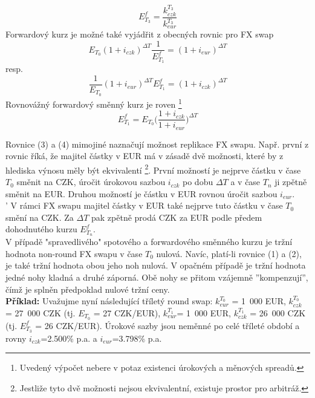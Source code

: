 \documentclass[a4paper]{article}
\begin{document}
\begin{displaymath}
E^f_{T_3} = \frac{k_{czk}^{T_3}}{k_{eur}^{T_3}}
\end{displaymath}
Forwardový kurz je možné také vyjádřit z obecných rovnic pro FX swap
\begin{equation}
E_{T_0} (1 + i_{czk})^{\Delta T} \frac{1}{E^f_{T_1}} = (1 + i_{eur})^{\Delta T}
\end{equation}
resp.
\begin{equation}
\frac{1}{E_{T_0}}(1 + i_{eur})^{\Delta T} E^f_{T_1} = (1 + i_{czk})^{\Delta T}
\end{equation}
Rovnovážný forwardový směnný kurz je roven \footnote{Uvedený výpočet nebere v potaz existenci úrokových a měnových spreadů.}
\begin{displaymath}
E^f_{T_1} = E_{T_0} \Bigg( \frac{1+i_{czk}}{1+i_{eur}} \Bigg)^{\Delta T}
\end{displaymath}

Rovnice (3) a (4) mimojiné naznačují možnost replikace FX swapu. Např. první z rovnic říká, že majitel částky v EUR má v zásadě dvě možnosti, které by z hlediska výnosu měly být ekvivalentí \footnote{Jestliže tyto dvě možnosti nejsou ekvivalentní, existuje prostor pro arbitráž.}. První možností je nejprve částku v čase $T_0$ směnit na CZK, úročit úrokovou sazbou $i_{czk}$ po dobu $\Delta T$ a v čase $T_n$ ji zpětně směnit na EUR. Druhou možností je částku v EUR rovnou úročit sazbou $i_{eur}$.\\'
V rámci FX swapu majitel částky v EUR také nejprve tuto částku v čase $T_0$ smění na CZK. Za $\Delta T$ pak zpětně prodá CZK za EUR podle předem dohodnutého kurzu $E^f_{T_n}$.\\

V případě "spravedlivého" spotového a forwardového směnného kurzu je tržní hodnota non-round FX swapu v čase $T_0$ nulová. Navíc, platí-li rovnice (1) a (2), je také tržní hodnota obou jeho noh nulová. V opačném případě je tržní hodnota jedné nohy kladná a druhé záporná. Obě nohy se přitom vzájemně ''kompenzují'', čímž je splněn předpoklad nulové tržní ceny.\\

\noindent \textbf{Příklad:} Uvažujme nyní následující tříletý round swap: $k_{eur}^{T_0}$ = 1~000 EUR, $k_{czk}^{T_0}$ = 27~000 CZK (tj. $E_{T_0}$ = 27 CZK/EUR), $k_{eur}^{T_1}$= 1~000 EUR, $k_{czk}^{T_1}$ = 26~000 CZK (tj. $E^f_{T_3}$ = 26 CZK/EUR). Úrokové sazby jsou neměnné po celé tříleté období a rovny $i_{czk}$=2.500\% p.a. a $i_{eur}$=3.798\% p.a.
\end{document}
